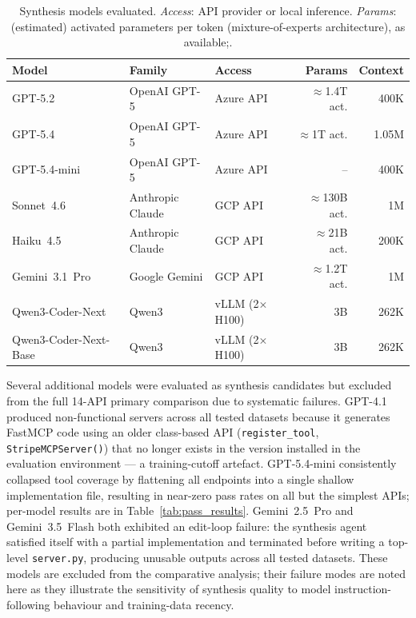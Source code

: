 \begin{table}[ht]
\centering
\scriptsize
\caption{Synthesis models evaluated. \emph{Access}: API provider or local inference. \emph{Params}: (estimated) activated parameters per token (mixture-of-experts architecture), as available;.}
\label{tab:models}
\setlength{\tabcolsep}{2.7pt}
\begin{tabular}{lllrr}
\toprule
\textbf{Model} & \textbf{Family} & \textbf{Access} & \textbf{Params} & \textbf{Context} \\
\midrule
GPT-5.2              & OpenAI GPT-5    & Azure API            & $\approx$1.4T act.  & 400K   \\
GPT-5.4              & OpenAI GPT-5    & Azure API            & $\approx$1T act.  & 1.05M  \\
GPT-5.4-mini         & OpenAI GPT-5    & Azure API            & --  & 400K  \\
Sonnet~4.6           & Anthropic Claude & GCP API             &  $\approx$130B act.  & 1M     \\
Haiku~4.5            & Anthropic Claude & GCP API             & $\approx$21B act.  & 200K   \\
Gemini~3.1~Pro       & Google Gemini   & GCP API              & $\approx$1.2T act.  & 1M     \\
Qwen3-Coder-Next     & Qwen3           & vLLM (2$\times$H100) & 3B & 262K   \\
Qwen3-Coder-Next-Base & Qwen3          & vLLM (2$\times$H100) & 3B & 262K   \\
\bottomrule
\end{tabular}
\end{table}

\noindent
Several additional models were evaluated as synthesis candidates but excluded from the full 14-API primary comparison due to systematic failures. GPT-4.1 produced
non-functional servers across all tested datasets because it generates FastMCP
code using an older class-based API (\texttt{register\_tool},
\texttt{StripeMCPServer()}) that no longer exists in the version installed in
the evaluation environment --- a training-cutoff artefact. GPT-5.4-mini
consistently collapsed tool coverage by flattening all endpoints into a single
shallow implementation file, resulting in near-zero pass rates on all but the
simplest APIs; per-model results are in Table~\ref{tab:pass_results}. Gemini~2.5~Pro and Gemini~3.5~Flash both exhibited an
edit-loop failure: the synthesis agent satisfied itself with a partial
implementation and terminated before writing a top-level \texttt{server.py},
producing unusable outputs across all tested datasets. These models are
excluded from the comparative analysis; their failure modes are noted here as
they illustrate the sensitivity of synthesis quality to model instruction-following
behaviour and training-data recency.

